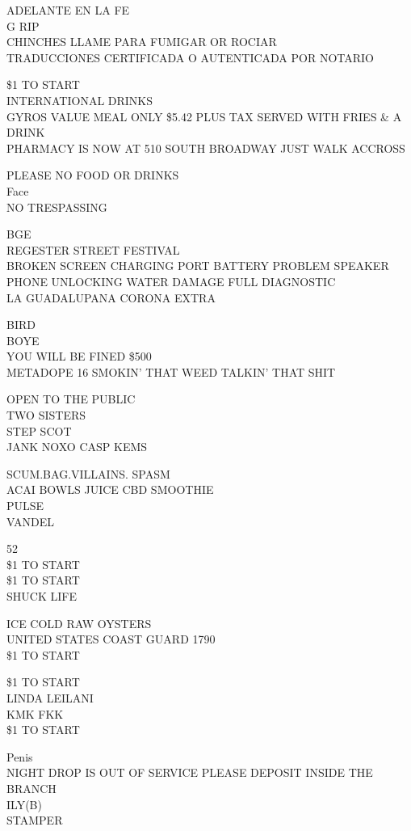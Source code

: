 \documentclass[10pt,letterpaper]{article}
\begin{document}
ADELANTE EN LA FE\\
G RIP\\
CHINCHES LLAME PARA FUMIGAR OR ROCIAR\\
TRADUCCIONES CERTIFICADA O AUTENTICADA POR NOTARIO

\$1 TO START\\
INTERNATIONAL DRINKS\\
GYROS VALUE MEAL ONLY \$5.42 PLUS TAX SERVED WITH FRIES \& A DRINK\\
PHARMACY IS NOW AT 510 SOUTH BROADWAY JUST WALK ACCROSS

PLEASE NO FOOD OR DRINKS\\
Face\\
NO TRESPASSING

BGE\\
REGESTER STREET FESTIVAL\\
BROKEN SCREEN CHARGING PORT BATTERY PROBLEM SPEAKER PHONE UNLOCKING WATER DAMAGE FULL DIAGNOSTIC\\
LA GUADALUPANA CORONA EXTRA

BIRD\\
BOYE\\
YOU WILL BE FINED \$500\\
METADOPE 16 SMOKIN' THAT WEED TALKIN' THAT SHIT

OPEN TO THE PUBLIC\\
TWO SISTERS\\
STEP SCOT\\
JANK NOXO CASP KEMS

SCUM.BAG.VILLAINS. SPASM\\
ACAI BOWLS JUICE CBD SMOOTHIE\\
PULSE\\
VANDEL

52\\
\$1 TO START\\
\$1 TO START\\
SHUCK LIFE

ICE COLD RAW OYSTERS\\
UNITED STATES COAST GUARD 1790\\
\$1 TO START

\$1 TO START\\
LINDA LEILANI\\
KMK FKK\\
\$1 TO START

Penis\\
NIGHT DROP IS OUT OF SERVICE PLEASE DEPOSIT INSIDE THE BRANCH\\
ILY(B)\\
STAMPER
\end{document}

